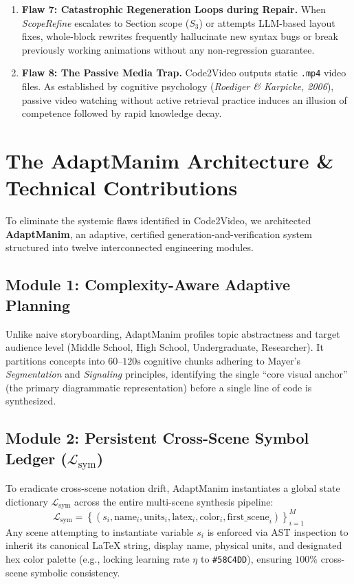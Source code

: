 \documentclass[11pt, a4paper]{article}
\begin{document}
\begin{enumerate}[leftmargin=*]
    \item \textbf{Flaw 7: Catastrophic Regeneration Loops during Repair.} When \textit{ScopeRefine} escalates to Section scope ($S_3$) or attempts LLM-based layout fixes, whole-block rewrites frequently hallucinate new syntax bugs or break previously working animations without any non-regression guarantee.
    \item \textbf{Flaw 8: The Passive Media Trap.} Code2Video outputs static \texttt{.mp4} video files. As established by cognitive psychology (\textit{Roediger \& Karpicke, 2006}), passive video watching without active retrieval practice induces an illusion of competence followed by rapid knowledge decay.
\end{enumerate}

\section{The AdaptManim Architecture \& Technical Contributions}

To eliminate the systemic flaws identified in Code2Video, we architected \textbf{AdaptManim}, an adaptive, certified generation-and-verification system structured into twelve interconnected engineering modules.

\subsection{Module 1: Complexity-Aware Adaptive Planning}
Unlike naive storyboarding, AdaptManim profiles topic abstractness and target audience level (Middle School, High School, Undergraduate, Researcher). It partitions concepts into $60\text{--}120\text{s}$ cognitive chunks adhering to Mayer's \textit{Segmentation} and \textit{Signaling} principles, identifying the single ``core visual anchor'' (the primary diagrammatic representation) before a single line of code is synthesized.

\subsection{Module 2: Persistent Cross-Scene Symbol Ledger ($\mathcal{L}_{\text{sym}}$)}
To eradicate cross-scene notation drift, AdaptManim instantiates a global state dictionary $\mathcal{L}_{\text{sym}}$ across the entire multi-scene synthesis pipeline:
\begin{equation}
\mathcal{L}_{\text{sym}} = \left\{\left(s_i, \text{name}_i, \text{units}_i, \text{latex}_i, \text{color}_i, \text{first\_scene}_i\right)\right\}_{i=1}^{M}
\end{equation}
Any scene attempting to instantiate variable $s_i$ is enforced via AST inspection to inherit its canonical \LaTeX{} string, display name, physical units, and designated hex color palette (e.g., locking learning rate $\eta$ to \texttt{\#58C4DD}), ensuring $100\%$ cross-scene symbolic consistency.
\end{document}
